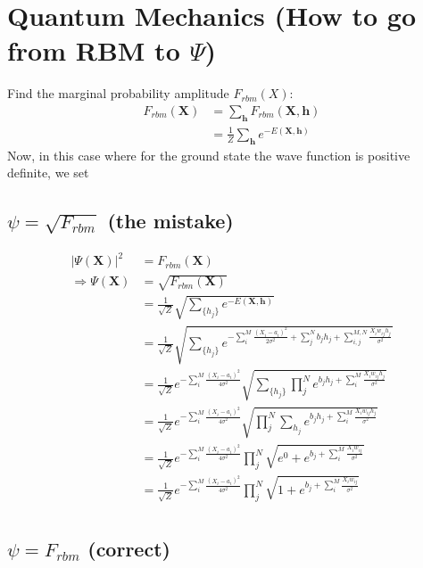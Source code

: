 \documentclass[norsk,a4paper,11pt]{article}
\begin{document}
\section{Quantum Mechanics (How to go from RBM to $\Psi$)}
Find the marginal probability amplitude $F_{rbm}(X)$:
\begin{align}
	F_{rbm}(\mathbf{X}) &= \sum_\mathbf{h} F_{rbm}(\mathbf{X}, \mathbf{h}) \\
				&= \frac{1}{Z}\sum_\mathbf{h} e^{-E(\mathbf{X}, \mathbf{h})}
\end{align}
Now, in this case where for the ground state the wave function is positive definite, we set

\color{Green}
\subsection{$\psi = \sqrt{F_{rbm}}$ (the mistake)}
\color{Black}
\begin{align}
	|\Psi (\mathbf{X})|^2 &= F_{rbm}(\mathbf{X}) \\
	\Rightarrow \Psi (\mathbf{X}) &= \sqrt{F_{rbm}(\mathbf{X})} \\
	&= \frac{1}{\sqrt{Z}}\sqrt{\sum_{\{h_j\}} e^{-E(\mathbf{X}, \mathbf{h})}} \\
	&= \frac{1}{\sqrt{Z}} \sqrt{\sum_{\{h_j\}} e^{-\sum_i^M \frac{(X_i - a_i)^2}{2\sigma^2} + \sum_j^N b_j h_j + \sum_{i,j}^{M,N} \frac{X_i w_{ij} h_j}{\sigma^2}} }\\
	&= \frac{1}{\sqrt{Z}} e^{-\sum_i^M \frac{(X_i - a_i)^2}{4\sigma^2}} \sqrt{\sum_{\{h_j\}} \prod_j^N e^{b_j h_j + \sum_i^M \frac{X_i w_{ij} h_j}{\sigma^2}}} \\
	&= \frac{1}{\sqrt{Z}} e^{-\sum_i^M \frac{(X_i - a_i)^2}{4\sigma^2}} \sqrt{\prod_j^N \sum_{h_j}  e^{b_j h_j + \sum_i^M \frac{X_i w_{ij} h_j}{\sigma^2}}} \\
	&= \frac{1}{\sqrt{Z}} e^{-\sum_i^M \frac{(X_i - a_i)^2}{4\sigma^2}} \prod_j^N \sqrt{e^0 + e^{b_j + \sum_i^M \frac{X_i w_{ij}}{\sigma^2}}} \\
	&= \frac{1}{\sqrt{Z}} e^{-\sum_i^M \frac{(X_i - a_i)^2}{4\sigma^2}} \prod_j^N \sqrt{1 + e^{b_j + \sum_i^M \frac{X_i w_{ij}}{\sigma^2}}} \\
\end{align}

\color{Blue}
\subsection{$\psi = F_{rbm}$ (correct)}
\color{Black}
\end{document}

